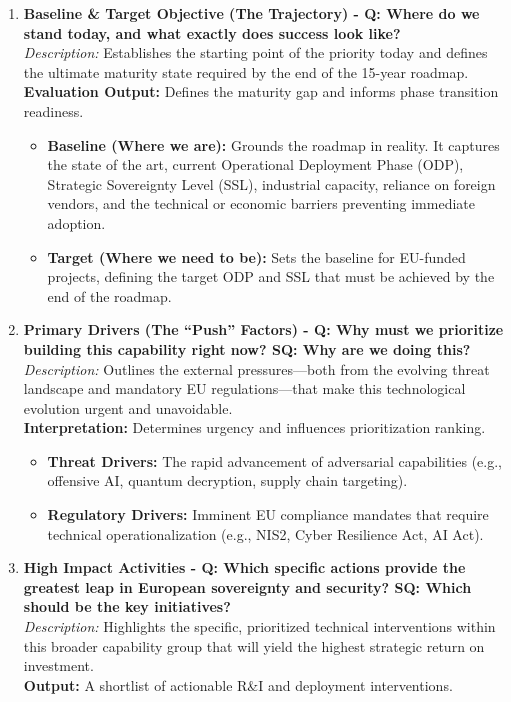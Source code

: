 \documentclass{ieeeaccess}
\begin{document}
\begin{enumerate}
    \item \textbf{Baseline \& Target Objective (The Trajectory) - Q: Where do we stand today, and what exactly does success look like?}\\
    \textit{Description:} Establishes the starting point of the priority today and defines the ultimate maturity state required by the end of the 15-year roadmap.\\
    \textbf{Evaluation Output:} Defines the maturity gap and informs phase transition readiness.
    \begin{itemize}
    \item \textbf{Baseline (Where we are):} Grounds the roadmap in reality. It captures the state of the art, current Operational Deployment Phase (ODP), Strategic Sovereignty Level (SSL), industrial capacity, reliance on foreign vendors, and the technical or economic barriers preventing immediate adoption.
    \item \textbf{Target (Where we need to be):} Sets the baseline for EU-funded projects, defining the target ODP and SSL that must be achieved by the end of the roadmap.
\end{itemize}
    
    \item \textbf{Primary Drivers (The ``Push'' Factors) - Q: Why must we prioritize building this capability right now? SQ: Why are we doing this?}\\
    \textit{Description:} Outlines the external pressures---both from the evolving threat landscape and mandatory EU regulations---that make this technological evolution urgent and unavoidable.\\
    \textbf{Interpretation:} Determines urgency and influences prioritization ranking.
    \begin{itemize}
        \item \textbf{Threat Drivers:} The rapid advancement of adversarial capabilities (e.g., offensive AI, quantum decryption, supply chain targeting).
        \item \textbf{Regulatory Drivers:} Imminent EU compliance mandates that require technical operationalization (e.g., NIS2, Cyber Resilience Act, AI Act).
    \end{itemize}

    \item \textbf{High Impact Activities - Q: Which specific actions provide the greatest leap in European sovereignty and security? SQ: Which should be the key initiatives?}\\
    \textit{Description:} Highlights the specific, prioritized technical interventions within this broader capability group that will yield the highest strategic return on investment.\\
    \textbf{Output:} A shortlist of actionable R\&I and deployment interventions.


\end{enumerate}
\end{document}
